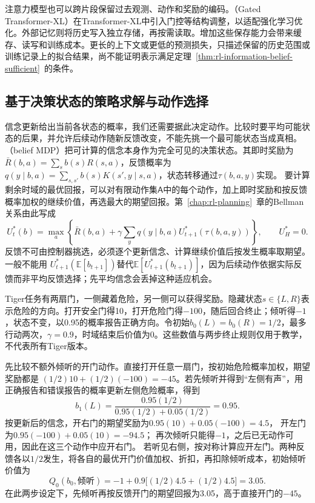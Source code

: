 注意力模型也可以跨片段保留过去观测、动作和奖励的编码。（Gated Transformer-XL）在Transformer-XL中引入门控等结构调整，以适配强化学习优化。外部记忆则将历史写入独立存储，再按需读取。增加这些保存能力会带来缓存、读写和训练成本。更长的上下文或更低的预测损失，只描述保留的历史范围或训练记录上的拟合结果，尚不能证明表示满足定理~\ref{thm:rl-information-belief-sufficient}~的条件。

\subsection{基于决策状态的策略求解与动作选择}
\label{sec:rl-information-belief-control}

信念更新给出当前各状态的概率，我们还需要据此决定动作。比较时要平均可能状态的后果，并允许后续动作随新反馈改变，不能先挑一个最可能状态当成真相。（belief MDP）把可计算的信念本身作为完全可见的决策状态。其即时奖励为
$\bar R(b,a)=\sum_s b(s)R(s,a)$，反馈概率为
$q(y\mid b,a)=\sum_{s,s'}b(s)K(s',y\mid s,a)$，状态转移通过$\tau(b,a,y)$实现。
要计算剩余时域的最优回报，可以对有限动作集$\mathsf A$中的每个动作，加上即时奖励和按反馈概率加权的继续价值，再选最大的期望回报。第~\ref{chap:rl-planning}~章的Bellman关系由此写成
\begin{equation}
  \label{eq:rl-information-belief-bellman}
  U_t^*(b)=\max_a\left\{
    \bar R(b,a)+\gamma\sum_yq(y\mid b,a)
                    U_{t+1}^*(\tau(b,a,y))\right\},
  \qquad U_H^*=0.
\end{equation}
反馈不可由控制器挑选，必须逐个更新信念、计算继续价值后按发生概率取期望。一般不能用
$U_{t+1}^*(\mathbb E[b_{t+1}])$替代$\mathbb E[U_{t+1}^*(b_{t+1})]$，因为后续动作依据实际反馈而非平均反馈选择；先平均信念会丢掉这种适应机会。

\begin{example}
  \label{ex:rl-information-tiger}
  Tiger任务有两扇门，一侧藏着危险，另一侧可以获得奖励。隐藏状态$s\in\{L,R\}$表示危险的方向。打开安全门得10，打开危险门得$-100$，随后回合终止；倾听得$-1$，状态不变，以0.95的概率报告正确方向。令初始$b_0(L)=b_0(R)=1/2$，最多行动两次，$\gamma=0.9$，时域结束后价值为0。这些数值与两步终止规则仅用于教学，不代表所有Tiger版本。

  先比较不额外倾听的开门动作。直接打开任意一扇门，按初始危险概率加权，期望奖励都是
  $(1/2)10+(1/2)(-100)=-45$。若先倾听并得到“左侧有声”，用正确报告和错误报告的概率更新左侧危险概率，得到
  \[
    b_1(L)=\frac{0.95(1/2)}
                        {0.95(1/2)+0.05(1/2)}=0.95.
  \]
  按更新后的信念，开右门的期望奖励为$0.95(10)+0.05(-100)=4.5$，
  开左门为$0.95(-100)+0.05(10)=-94.5$；
  再次倾听只能得$-1$，之后已无动作可用，因此在这三个动作中应开右门。
  若听见右侧，按对称计算应开左门。两种反馈各以$1/2$发生，将各自的最优开门价值加权、折扣，再扣除倾听成本，初始倾听价值为
  \[
    Q_0(b_0,\text{倾听})
       =-1+0.9\bigl[(1/2)4.5+(1/2)4.5\bigr]=3.05.
  \]
  在此两步设定下，先倾听再按反馈开门的期望回报为3.05，高于直接开门的$-45$。
\end{example}

